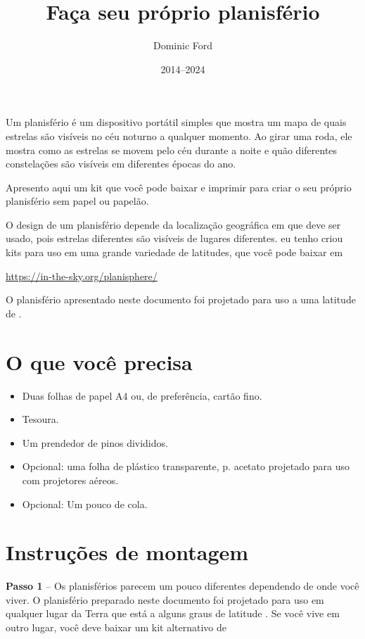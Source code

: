 \documentclass[a4paper,onecolumn,10pt]{article}
\title{Faça seu próprio planisfério}
\author{Dominic Ford}
\date{2014--2024}
\begin{document}
\maketitle
\setcounter{footnote}{1}

Um planisfério é um dispositivo portátil simples que mostra um mapa de quais estrelas 
são visíveis no céu noturno a qualquer momento. Ao girar uma roda, ele mostra
como as estrelas se movem pelo céu durante a noite e quão diferentes
constelações são visíveis em diferentes épocas do ano.

Apresento aqui um kit que você pode baixar e imprimir para criar o seu próprio
planisfério sem papel ou papelão.

O design de um planisfério depende da localização geográfica em que deve
ser usado, pois estrelas diferentes são visíveis de lugares diferentes. eu tenho
criou kits para uso em uma grande variedade de latitudes, que você pode baixar em

\url{https://in-the-sky.org/planisphere/}

O planisfério apresentado neste documento foi projetado para uso a uma latitude de
.
 
\section*{O que você precisa}

\begin{itemize}
\item Duas folhas de papel A4 ou, de preferência, cartão fino.
\item Tesoura.
\item Um prendedor de pinos divididos.
\item Opcional: uma folha de plástico transparente, p. acetato projetado para uso 
com projetores aéreos.
\item Opcional: Um pouco de cola.
\end{itemize}

\section*{Instruções de montagem}

{\bf Passo 1} -- Os planisférios parecem um pouco diferentes dependendo de onde você 
viver. O planisfério preparado neste documento foi projetado para uso em qualquer 
lugar da Terra que está a alguns graus de latitude . Se você vive
em outro lugar, você deve baixar um kit alternativo de
\end{document}
